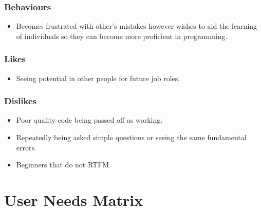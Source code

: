 \documentclass[11pt,a4paper]{article}
\begin{document}
\subsubsection{Behaviours}

\begin{itemize}
\item Becomes frustrated with other's mistakes however wishes to aid the
learning of individuals so they can become more proficient in programming.
\end{itemize}

\subsubsection{Likes}

\begin{itemize}
\item Seeing potential in other people for future job roles.
\end{itemize}

\subsubsection{Dislikes}

\begin{itemize}
\item Poor quality code being passed off as working.
\item Repeatedly being asked simple questions or seeing the same fundamental
errors.
\item Beginners that do not RTFM.
\end{itemize}

\newpage

\section{User Needs Matrix}
\end{document}
